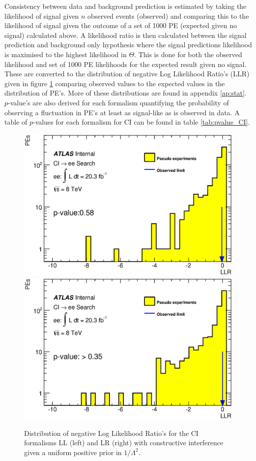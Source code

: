     Consistency between data and background prediction is estimated by taking the likelihood of signal given $n$ observed events (observed) and comparing this to the likelihood of signal given the outcome of a set of 1000 PE (expected given no signal) calculated above. A likelihood ratio is then calculated between the signal prediction and background only hypothesis where the signal predictions likelihood is maximised to the highest likelihood in $\Theta$. This is done for both the observed likelihood and set of 1000 PE likelihoods for the expected result given no signal. These are converted to the distribution of negative Log Likelihood Ratio's (LLR) given in figure \ref{fig:LLR_CI_main} comparing observed values to the expected values in the distribution of PE's. More of these distributions are found in appendix \ref{ap:stat}. $p$-value's are also derived for each formalism quantifying the probability of observing a fluctuation in PE's at least as signal-like as is observed in data. A table of $p$-values for each formalism for CI can be found in table \ref{tab:pvalue_CI}. 



    \begin{figure}[h]
        \begin{center}
            \includegraphics[width=0.49\linewidth]{images/ee__LL_minus_L2/LLR.eps}
            \includegraphics[width=0.49\linewidth]{images/ee__LR_minus_L2/LLR.eps}
        \end{center}
       \caption{Distribution of negative Log Likelihood Ratio's for the CI formalisms LL (left) and LR (right) with constructive interference given a uniform positive prior in $1/\Lambda^{2}$.}
       \label{fig:LLR_CI_main}
    \end{figure}

